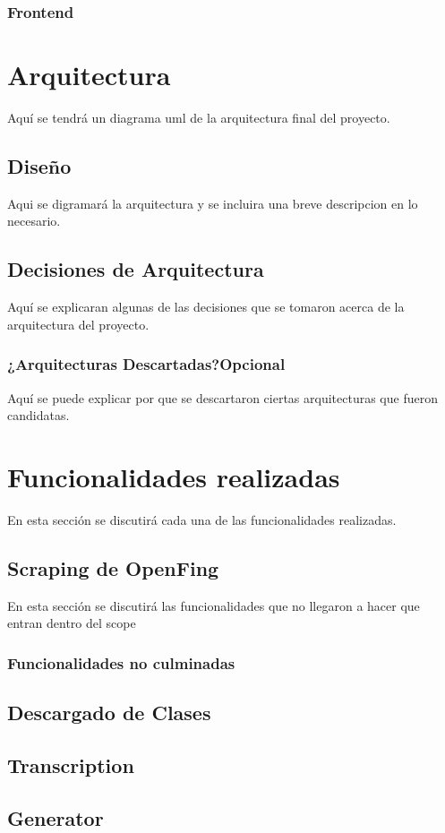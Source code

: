 \documentclass{../../prgrado}
\begin{document}
\subsection{Frontend}


\chapter{Arquitectura}
Aquí se tendrá un diagrama uml de la arquitectura final del proyecto.
\section{Diseño}
Aqui se digramará la arquitectura y se incluira una  breve descripcion en lo necesario. 
\section{Decisiones de Arquitectura}
Aquí se explicaran algunas de las decisiones que se tomaron acerca de la arquitectura del proyecto. 
\subsection{¿Arquitecturas Descartadas?Opcional}
Aquí se puede explicar por que se descartaron ciertas arquitecturas que fueron candidatas.


\chapter{Funcionalidades realizadas}
En esta sección se discutirá cada una de las funcionalidades realizadas. 
\section{Scraping de OpenFing}
En esta sección se discutirá las funcionalidades que no llegaron a hacer que entran dentro del scope
\subsection{Funcionalidades no culminadas}
\section{Descargado de Clases}
\section{Transcription}
\section{Generator}
\end{document}

